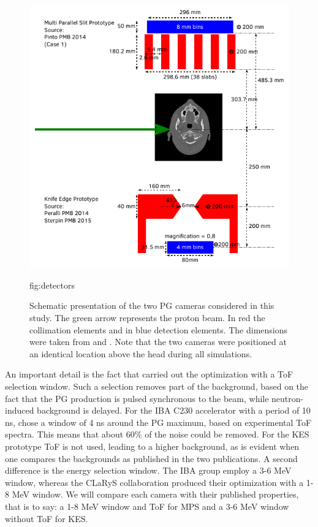 \documentclass[a4paper,english]{article}
\begin{document}
\begin{figure}[htp]
  \centering
  \includegraphics[width=0.9\linewidth]{detectors}
  \caption{Schematic presentation of the two PG cameras considered in this study. The green arrow represents the proton beam. In red the collimation elements and in blue detection elements. The dimensions were taken from \cite{Pinto2014a} and \cite{Perali2014,Sterpin2015}. Note that the two cameras were positioned at an identical location above the head during all simulations.}
  \label{fig:detectors}{fig:detectors}
\end{figure}

An important detail is the fact that \cite{Pinto2014a} carried out the optimization with a ToF selection window. Such a selection removes part of the background, based on the fact that the PG production is pulsed synchronous to the beam, while neutron-induced background is delayed. For the IBA C230 accelerator with a period of 10 ns, \cite{Pinto2014a} chose a window of 4 ns around the PG maximum, based on experimental ToF spectra. This means that about 60\% of the noise could be removed. For the KES prototype ToF is not used, leading to a higher background, as is evident when one compares the backgrounds as published in the two publications. A second difference is the energy selection window. The IBA group employ a 3-6 MeV window, whereas the CLaRyS collaboration produced their optimization with a 1-8 MeV window. We will compare each camera with their published properties, that is to say: a 1-8 MeV window and ToF for MPS and a 3-6 MeV window without ToF for KES.
\end{document}
